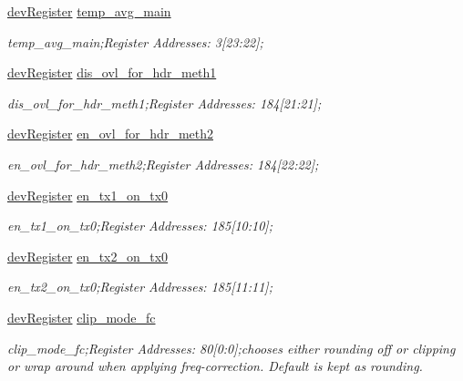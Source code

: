 \begin{DoxyCompactItemize}
\mbox{\hyperlink{classdev_register}{dev\+Register}} \mbox{\hyperlink{class_o_p_t3101_registers_ad0db66a039e2db4366a425625bafd68f}{temp\+\_\+avg\+\_\+main}}
\begin{DoxyCompactList}\small\item\em temp\+\_\+avg\+\_\+main;Register Addresses\+: 3\mbox{[}23\+:22\mbox{]}; \end{DoxyCompactList}\item 
\mbox{\hyperlink{classdev_register}{dev\+Register}} \mbox{\hyperlink{class_o_p_t3101_registers_a9ab51119f9bf4af2ca08e61606899677}{dis\+\_\+ovl\+\_\+for\+\_\+hdr\+\_\+meth1}}
\begin{DoxyCompactList}\small\item\em dis\+\_\+ovl\+\_\+for\+\_\+hdr\+\_\+meth1;Register Addresses\+: 184\mbox{[}21\+:21\mbox{]}; \end{DoxyCompactList}\item 
\mbox{\hyperlink{classdev_register}{dev\+Register}} \mbox{\hyperlink{class_o_p_t3101_registers_a90eba53ebb9b8a8e9d324106905e4486}{en\+\_\+ovl\+\_\+for\+\_\+hdr\+\_\+meth2}}
\begin{DoxyCompactList}\small\item\em en\+\_\+ovl\+\_\+for\+\_\+hdr\+\_\+meth2;Register Addresses\+: 184\mbox{[}22\+:22\mbox{]}; \end{DoxyCompactList}\item 
\mbox{\hyperlink{classdev_register}{dev\+Register}} \mbox{\hyperlink{class_o_p_t3101_registers_a6aec1f1dcdba6a03e15b875514747c00}{en\+\_\+tx1\+\_\+on\+\_\+tx0}}
\begin{DoxyCompactList}\small\item\em en\+\_\+tx1\+\_\+on\+\_\+tx0;Register Addresses\+: 185\mbox{[}10\+:10\mbox{]}; \end{DoxyCompactList}\item 
\mbox{\hyperlink{classdev_register}{dev\+Register}} \mbox{\hyperlink{class_o_p_t3101_registers_ae6dad95a9a9dcc0475e3fa0b341aa0c9}{en\+\_\+tx2\+\_\+on\+\_\+tx0}}
\begin{DoxyCompactList}\small\item\em en\+\_\+tx2\+\_\+on\+\_\+tx0;Register Addresses\+: 185\mbox{[}11\+:11\mbox{]}; \end{DoxyCompactList}\item 
\mbox{\hyperlink{classdev_register}{dev\+Register}} \mbox{\hyperlink{class_o_p_t3101_registers_a318a282572480ca224337d59f66ad5d5}{clip\+\_\+mode\+\_\+fc}}
\begin{DoxyCompactList}\small\item\em clip\+\_\+mode\+\_\+fc;Register Addresses\+: 80\mbox{[}0\+:0\mbox{]};chooses either rounding off or clipping or wrap around when applying freq-\/correction. Default is kept as rounding. \end{DoxyCompactList}\item 

\end{DoxyCompactItemize}
